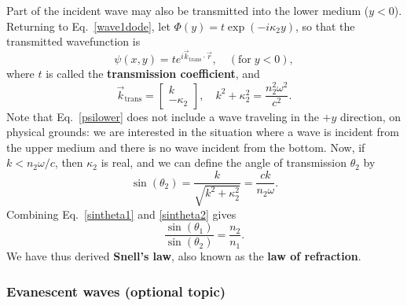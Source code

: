 \documentclass[10pt,a4paper]{article}
\begin{document}
Part of the incident wave may also be transmitted into the lower
medium ($y < 0$).  Returning to Eq.~\eqref{wave1dode}, let $\Phi(y) =
t \exp(-i\kappa_2y)$, so that the transmitted wavefunction is
\begin{equation}
  \psi(x,y) = t e^{i\vec{k}_{\mathrm{trans}}\cdot \vec{r}}, \quad(\textrm{for} \; y < 0),
  \label{psilower}
\end{equation}
where $t$ is called the \textbf{transmission coefficient}, and
\begin{equation}
  \vec{k}_{\mathrm{trans}} =
  \begin{bmatrix}k \\ -\kappa_2 \end{bmatrix}, \quad
  k^2 + \kappa_2^2 = \frac{n_2^2\omega^2}{c^2}.
  \label{psilower2}
\end{equation}
Note that Eq.~\eqref{psilower} does not include a wave traveling in
the $+y$ direction, on physical grounds: we are interested in the
situation where a wave is incident from the upper medium and there is
no wave incident from the bottom.  Now, if $k < n_2 \omega / c$,
then $\kappa_2$ is real, and we can define the angle of transmission
$\theta_2$ by
\begin{equation}
  \sin(\theta_2) = \frac{k}{\sqrt{k^2 + \kappa_2^2}} =
  \frac{ck}{n_2\omega}.
  \label{sintheta2}
\end{equation}
Combining Eq.~\eqref{sintheta1} and \eqref{sintheta2} gives
\begin{equation}
  \frac{\sin(\theta_1)}{\sin(\theta_2)} = \frac{n_2}{n_1}.
\end{equation}
We have thus derived \textbf{Snell's law}, also known as the
\textbf{law of refraction}.

\subsubsection{Evanescent waves (optional topic)}
\end{document}
